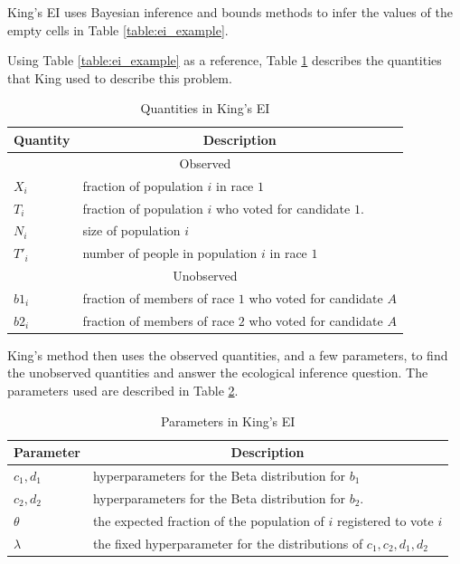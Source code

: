 \documentclass[fleqn,10pt]{style}
\begin{document}
King's EI uses Bayesian inference and bounds methods to infer the values of the empty cells in Table \ref{table:ei_example}.

Using Table \ref{table:ei_example} as a reference, Table \ref{table:ei_quantities} describes the quantities that King used to describe this problem\cite{king1999}.

\begin{table}[ht]
 \centering
 \caption{Quantities in King's EI}
 \label{table:ei_quantities}
 \begin{tabular}{|l|l|}
  \hline
  \multicolumn{1}{|c|}{Quantity} & \multicolumn{1}{|c|}{Description}                           \\
  \hline
  \multicolumn{2}{|c|}{Observed}                                                               \\
  \hline
  $X_i$                          & fraction of population $i$ in race $1$                      \\
  $T_i$                          & fraction of population $i$ who voted for candidate $1$.     \\
  $N_i$                          & size of population $i$                                      \\
  $T'_i$                         & number of people in population $i$ in race $1$              \\
  \hline
  \multicolumn{2}{|c|}{Unobserved}                                                             \\
  \hline
  $b1_i$                         & fraction of members of race $1$ who voted for candidate $A$ \\
  $b2_i$                         & fraction of members of race $2$ who voted for candidate $A$ \\
  \hline
 \end{tabular}
\end{table}

King's method then uses the observed quantities, and a few parameters, to find the unobserved quantities and answer the ecological inference question. The parameters used are described in Table \ref{table:ei_params}.

\begin{table}[ht]
 \centering
 \caption{Parameters in King's EI}
 \label{table:ei_params}
 \begin{tabular}{|l|l|}
  \hline
  \multicolumn{1}{|c|}{Parameter} & \multicolumn{1}{|c|}{Description}                                     \\
  \hline
  $c_1, d_1$                     & hyperparameters for the Beta distribution for $b_1$                   \\
  $c_2, d_2$                     & hyperparameters for the Beta distribution for $b_2$.                  \\
  $\theta$                       & the expected fraction of the population of $i$ registered to vote $i$ \\
  $\lambda$                      & the fixed hyperparameter for the distributions of $c_1, c_2, d_1, d_2$ \\
  \hline
 \end{tabular}
\end{table}
\end{document}
